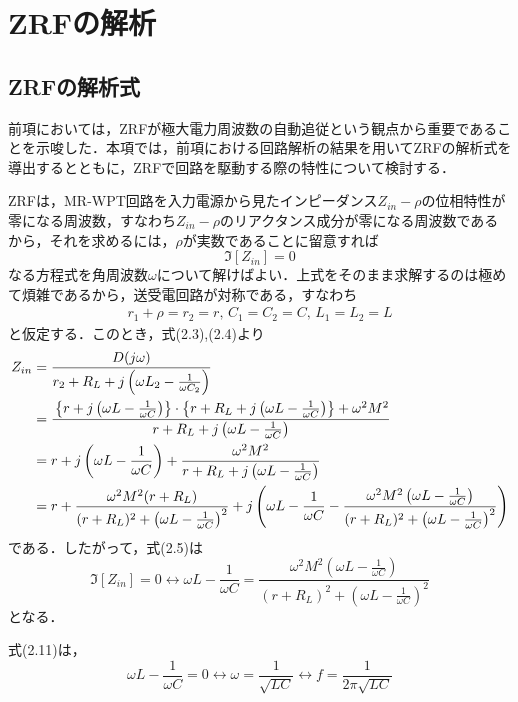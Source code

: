 \section{ZRFの解析}
\subsection{ZRFの解析式}
前項においては，ZRFが極大電力周波数の自動追従という観点から重要であることを示唆した．本項では，前項における回路解析の結果を用いてZRFの解析式を導出するとともに，ZRFで回路を駆動する際の特性について検討する．\par 
ZRFは，MR-WPT回路を入力電源から見たインピーダンス$Z_{in}-\rho$の位相特性が零になる周波数，すなわち$Z_{in}-\rho$のリアクタンス成分が零になる周波数であるから，それを求めるには，$\rho$が実数であることに留意すれば
\begin{equation}
\Im[Z_{in}]=0
\end{equation}
なる方程式を角周波数$\omega$について解けばよい．上式をそのまま求解するのは極めて煩雑であるから，送受電回路が対称である，すなわち
\begin{gather}
r_1+\rho = r_2=r, \, C_1=C_2=C, \, L_1=L_2=L
\end{gather}
と仮定する．このとき，式(2.3),(2.4)より
\begin{align}
Z_{in} &=\frac{D(j\omega)}{r_2+R_L+j\left(\omega L_2 -\frac{1}{\omega C_2}\right)} \\
&=\cfrac{\left\{r+j\left(\omega L -\frac{1}{\omega C}\right)\right\} \cdot \left\{{r+R_L+j\left(\omega L -\frac{1}{\omega C}\right)}\right\}+\omega^2 M^2}{r+R_L+j\left(\omega L -\frac{1}{\omega C}\right)} \\
&=r+j\left(\omega L -\frac{1}{\omega C}\right)+\frac{\omega^2 M^2}{r+R_L+j\left(\omega L -\frac{1}{\omega C}\right)} \\
&=r+\frac{\omega^2 M^2(r+R_L)}{(r+R_L)^2+\left(\omega L -\frac{1}{\omega C}\right)^2}+j\left(\omega L -\frac{1}{\omega C}-\frac{\omega^2 M^2 \left(\omega L -\frac{1}{\omega C}\right)}{(r+R_L)^2+\left(\omega L -\frac{1}{\omega C}\right)^2}\right)
\end{align}
である．したがって，式(2.5)は
\begin{equation}
\Im[Z_{in}]=0 \leftrightarrow \omega L -\frac{1}{\omega C}=\frac{\omega^2 M^2 \left(\omega L -\frac{1}{\omega C}\right)}{(r+R_L)^2+\left(\omega L -\frac{1}{\omega C}\right)^2}
\end{equation}
となる．\par 
式(2.11)は，
\begin{equation}
\omega L -\frac{1}{\omega C}=0 \leftrightarrow \omega=\frac{1}{\sqrt{LC}} \leftrightarrow f=\frac{1}{2\pi \sqrt{LC}}
\end{equation}
